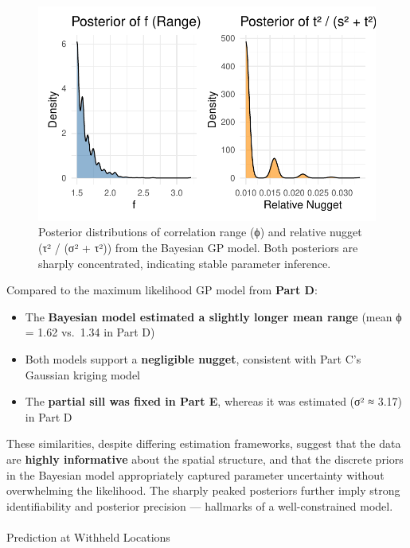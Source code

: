 \documentclass[
  11pt,
]{article}
\makeatletter
\let\oldparagraph\paragraph
\renewcommand{\paragraph}{
    \@ifstar
      \xxxParagraphStar
      \xxxParagraphNoStar
  }
\newcommand{\xxxParagraphStar}[1]{\oldparagraph*{#1}\mbox{}}
\newcommand{\xxxParagraphNoStar}[1]{\oldparagraph{#1}\mbox{}}
\makeatother
\begin{document}
\begin{figure}[H]

{\centering \includegraphics{project_files/figure-pdf/fig-posterior_sidebyside-1.pdf}

}

\caption{Posterior distributions of correlation range (ϕ) and relative
nugget (τ² / (σ² + τ²)) from the Bayesian GP model. Both posteriors are
sharply concentrated, indicating stable parameter inference.}

\end{figure}%

Compared to the maximum likelihood GP model from \textbf{Part D}:

\begin{itemize}
\item
  The \textbf{Bayesian model estimated a slightly longer mean range}
  (mean ϕ = 1.62 vs.~1.34 in Part D)
\item
  Both models support a \textbf{negligible nugget}, consistent with Part
  C's Gaussian kriging model
\item
  The \textbf{partial sill was fixed in Part E}, whereas it was
  estimated (σ² ≈ 3.17) in Part D
\end{itemize}

These similarities, despite differing estimation frameworks, suggest
that the data are \textbf{highly informative} about the spatial
structure, and that the discrete priors in the Bayesian model
appropriately captured parameter uncertainty without overwhelming the
likelihood. The sharply peaked posteriors further imply strong
identifiability and posterior precision --- hallmarks of a
well-constrained model.

\paragraph{Prediction at Withheld
Locations}\label{prediction-at-withheld-locations}
\end{document}
